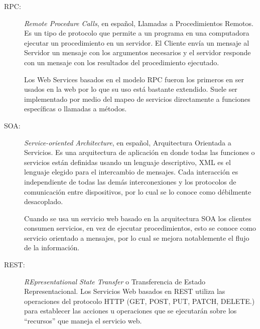 \begin{description}
  \item[RPC:] \emph{Remote Procedure Calls}, en español, Llamadas a Procedimientos Remotos. Es un tipo de protocolo que permite a un programa en una computadora ejecutar un procedimiento en un servidor. El Cliente envía un mensaje al Servidor un mensaje con los argumentos necesarios y el servidor responde con un mensaje con los resultados del procedimiento ejecutado.

  Los Web Services basados en el modelo RPC fueron los primeros en ser usados en la web por lo que su uso está bastante extendido. Suele ser implementado por medio del mapeo de servicios directamente a funciones específicas o llamadas a métodos.


  \item[SOA:] \emph{Service-oriented Architecture}, en español, Arquitectura Orientada a Servicios.
Es una arquitectura de aplicación en donde todas las funciones o servicios están definidas usando un lenguaje descriptivo, XML es el lenguaje elegido para el intercambio de mensajes. Cada interacción es independiente de todas las demás interconexiones y los protocolos de comunicación entre dispositivos, por lo cual se lo conoce como débilmente desacoplado.

Cuando se usa un servicio web basado en la arquitectura SOA los clientes consumen servicios, en vez de ejecutar procedimientos, esto se conoce como servicio orientado a mensajes, por lo cual se mejora notablemente el flujo de la información.


  \item[REST:] \emph{REpresentational State Transfer} o Transferencia de Estado Representacional.
  Los Servicios Web basados en REST utiliza las operaciones del protocolo HTTP (GET, POST, PUT, PATCH, DELETE.) para establecer las acciones u operaciones que se ejecutarán sobre los ``recursos'' que maneja el servicio web.

\end{description}

